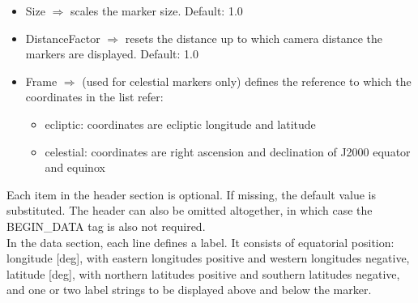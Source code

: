 \documentclass[Orbiter Developer Manual.tex]{subfiles}
\begin{document}
\begin{itemize}
\item Size $\Rightarrow$ scales the marker size. Default: 1.0
\item DistanceFactor $\Rightarrow$ resets the distance up to which camera distance the markers are displayed. Default: 1.0
\item Frame $\Rightarrow$ (used for celestial markers only) defines the reference to which the coordinates in the list refer:

\begin{itemize}
\item ecliptic: coordinates are ecliptic longitude and latitude
\item celestial: coordinates are right ascension and declination of J2000 equator and equinox
\end{itemize}

\end{itemize}

\noindent
Each item in the header section is optional. If missing, the default value is substituted. The header can also be omitted altogether, in which case the BEGIN\_DATA tag is also not required.\\
In the data section, each line defines a label. It consists of equatorial position: longitude [deg], with eastern longitudes positive and western longitudes negative, latitude [deg], with northern latitudes positive and southern latitudes negative, and one or two label strings to be displayed above and below the marker.
\end{document}
